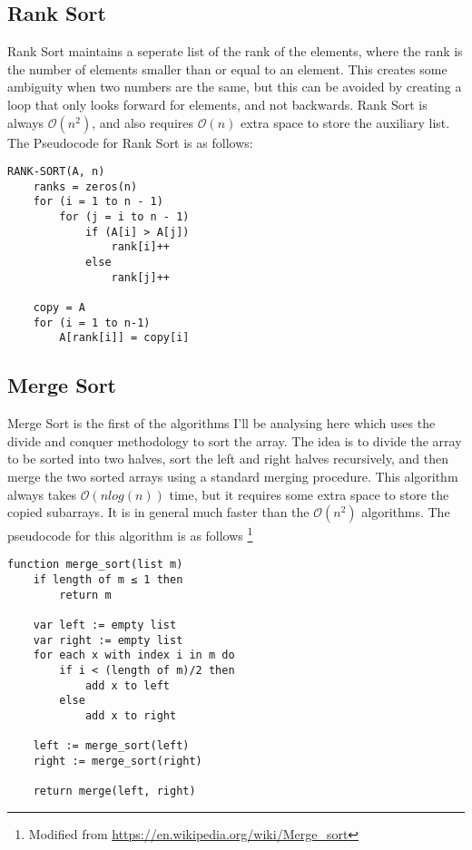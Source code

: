 \documentclass[12pt]{article}
\begin{document}
		\subsection{Rank Sort}
		Rank Sort maintains a seperate list of the rank of the elements, where the rank is the number of elements smaller than or equal to an element. This creates some ambiguity when two numbers are the same, but this can be avoided by creating a loop that only looks forward for elements, and not backwards. Rank Sort is always $ \mathcal{O} (n^2) $, and also requires $ \mathcal{O} (n) $ extra space to store the auxiliary list. The Pseudocode for Rank Sort is as follows:
		
		\begin{verbatim}
RANK-SORT(A, n)
    ranks = zeros(n)
    for (i = 1 to n - 1)
        for (j = i to n - 1)
            if (A[i] > A[j]) 
                rank[i]++
            else
                rank[j]++
	
    copy = A
    for (i = 1 to n-1)
        A[rank[i]] = copy[i]
		\end{verbatim}
		
		\subsection{Merge Sort}
		Merge Sort is the first of the algorithms I'll be analysing here which uses the divide and conquer methodology to sort the array. The idea is to divide the array to be sorted into two halves, sort the left and right halves recursively, and then merge the two sorted arrays using a standard merging procedure. This algorithm always takes $ \mathcal{O} (n log(n)) $ time, but it requires some extra space to store the copied subarrays. It is in general much faster than the $ \mathcal{O} (n^2) $ algorithms. The pseudocode for this algorithm is as follows \footnote{Modified from \url{https://en.wikipedia.org/wiki/Merge_sort}}
		
		\begin{verbatim}
function merge_sort(list m)
    if length of m ≤ 1 then
        return m

    var left := empty list
    var right := empty list
    for each x with index i in m do
        if i < (length of m)/2 then
            add x to left
        else
            add x to right

    left := merge_sort(left)
    right := merge_sort(right)

    return merge(left, right)
		\end{verbatim}
		
\end{document}
